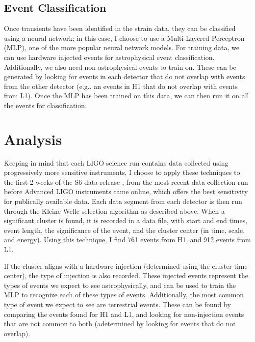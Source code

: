 \documentclass{article}
\begin{document}
\subsection{Event Classification}
Once transients have been identified in the strain data, they can be classified using a neural network; in this case, I choose to use a Multi-Layered Perceptron (MLP), one of the more popular neural network models. For training data, we can use hardware injected events for astrophysical event classification. Additionally, we also need non-astrophysical events to train on. These can be generated by looking for events in each detector that do not overlap with events from the other detector (e.g., an events in H1 that do not overlap with events from L1). Once the MLP has been trained on this data, we can then run it on all the events for classification.

\section{Analysis}
Keeping in mind that each LIGO science run contains data collected using progressively more sensitive instruments, I choose to apply these techniques to the first 2 weeks of the S6 data release \cite{LIGOScientificCollaboration2015}, from the most recent data collection run before Advanced LIGO instruments came online, which offers the best sensitivity for publically available data. Each data segment from each detector is then run through the Kleine Welle selection algorithm as described above. When a significant cluster is found, it is recorded in a data file, with start and end times, event length, the significance of the event, and the cluster center (in time, scale, and energy). Using this technique, I find 761 events from H1, and 912 events from L1.

If the cluster aligns with a hardware injection (determined using the cluster time-center), the type of injection is also recorded. These injected events represent the types of events we expect to see astrophysically, and can be used to train the MLP to recognize each of these types of events. Additionally, the most common type of event we expect to see are terrestrial events. These can be found by comparing the events found for H1 and L1, and looking for non-injection events that are not common to both (adetermined by looking for events that do not overlap).



\end{document}
